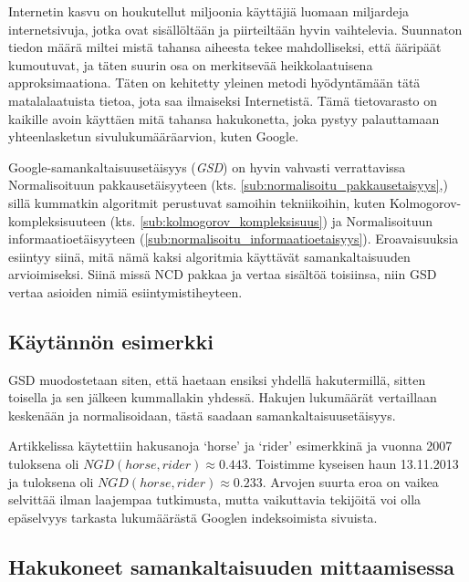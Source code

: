 \documentclass[12pt,finnish]{tktltiki2}
\theoremstyle{definition}
\theoremstyle{remark}
\begin{document}
    Internetin kasvu on houkutellut miljoonia käyttäjiä luomaan miljardeja internetsivuja, jotka ovat sisällöltään ja piirteiltään hyvin vaihtelevia.
    Suunnaton tiedon määrä miltei mistä tahansa aiheesta tekee mahdolliseksi, että ääripäät kumoutuvat, ja täten suurin osa on merkitsevää heikkolaatuisena approksimaationa.
    Täten on kehitetty yleinen metodi hyödyntämään tätä matalalaatuista tietoa, jota saa ilmaiseksi Internetistä.
    Tämä tietovarasto on kaikille avoin käyttäen mitä tahansa hakukonetta, joka pystyy palauttamaan yhteenlasketun sivulukumääräarvion, kuten Google.

    Google-samankaltaisuusetäisyys (\emph{GSD}) on hyvin vahvasti verrattavissa Normalisoituun pakkausetäisyyteen (kts. \ref{sub:normalisoitu_pakkausetaisyys},) sillä kummatkin algoritmit perustuvat samoihin tekniikoihin, kuten Kolmogorov-kompleksisuuteen (kts. \ref{sub:kolmogorov_kompleksisuus}) ja Normalisoituun informaatioetäisyyteen (\ref{sub:normalisoitu_informaatioetaisyys}).
    Eroavaisuuksia esiintyy siinä, mitä nämä kaksi algoritmia käyttävät samankaltaisuuden arvioimiseksi.
    Siinä missä NCD pakkaa ja vertaa sisältöä toisiinsa, niin GSD vertaa asioiden nimiä esiintymistiheyteen. \cite{cilibrasi2007google}

    \subsection{Käytännön esimerkki} %
    \label{sub:kaytannon_esimerkki}
      GSD muodostetaan siten, että haetaan ensiksi yhdellä hakutermillä, sitten toisella ja sen jälkeen kummallakin yhdessä.
      Hakujen lukumäärät vertaillaan keskenään ja normalisoidaan, tästä saadaan samankaltaisuusetäisyys.

      Artikkelissa \cite{cilibrasi2007google} käytettiin hakusanoja `horse' ja `rider' esimerkkinä ja vuonna 2007 tuloksena oli $NGD(horse, rider) \approx 0.443$.
      Toistimme kyseisen haun 13.11.2013 ja tuloksena oli $NGD(horse, rider) \approx 0.233$.
      Arvojen suurta eroa on vaikea selvittää ilman laajempaa tutkimusta, mutta vaikuttavia tekijöitä voi olla epäselvyys tarkasta lukumäärästä Googlen indeksoimista sivuista.


    \subsection{Hakukoneet samankaltaisuuden mittaamisessa} %
    \label{sub:hakukoneet_samankaltaisuuden_mittaamisessa}
\end{document}

